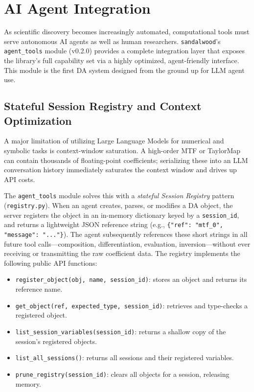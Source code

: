 \documentclass[aps,prb,reprint,superscriptaddress,nofootinbib]{revtex4-2}
\begin{document}
\section{AI Agent Integration}
\label{sec:agents}

As scientific discovery becomes increasingly automated, computational tools must serve autonomous AI agents as well as human researchers. \texttt{sandalwood}'s \texttt{agent\_tools} module (v0.2.0) provides a complete integration layer that exposes the library's full capability set via a highly optimized, agent-friendly interface. This module is the first DA system designed from the ground up for LLM agent use.

\subsection{Stateful Session Registry and Context Optimization}

A major limitation of utilizing Large Language Models for numerical and symbolic tasks is context-window saturation. A high-order MTF or TaylorMap can contain thousands of floating-point coefficients; serializing these into an LLM conversation history immediately saturates the context window and drives up API costs.

The \texttt{agent\_tools} module solves this with a \emph{stateful Session Registry} pattern (\texttt{registry.py}). When an agent creates, parses, or modifies a DA object, the server registers the object in an in-memory dictionary keyed by a \texttt{session\_id}, and returns a lightweight JSON reference string (e.g., \texttt{\{"ref": "mtf\_0", "message": "..."\}}). The agent subsequently references these short strings in all future tool calls---composition, differentiation, evaluation, inversion---without ever receiving or transmitting the raw coefficient data. The registry implements the following public API functions:

\begin{itemize}
    \item \texttt{register\_object(obj, name, session\_id)}: stores an object and returns its reference name.
    \item \texttt{get\_object(ref, expected\_type, session\_id)}: retrieves and type-checks a registered object.
    \item \texttt{list\_session\_variables(session\_id)}: returns a shallow copy of the session's registered objects.
    \item \texttt{list\_all\_sessions()}: returns all sessions and their registered variables.
    \item \texttt{prune\_registry(session\_id)}: clears all objects for a session, releasing memory.
\end{itemize}
\end{document}
